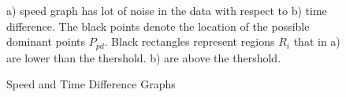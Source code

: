 \documentclass[preprint,10pt,5p,twocolumn]{elsarticle}
\begin{document}
 \begin{figure}
	\centering
			\hfill
	\caption{Speed and Time Difference Graphs}  a) speed graph has lot of noise in the data with respect to b) time difference.   The black points denote the location of the possible dominant points $P_{pd}$. Black rectangles represent regions $R_i$ that in a) are lower than the thershold. b) are above the thershold. 
	\label{fig:speed2Distance}
\end{figure}
\end{document}
